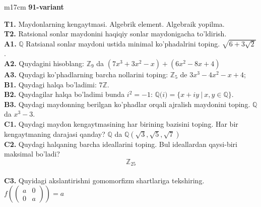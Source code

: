 \documentclass{article}
\begin{document}
\begin{tabular}{m{17cm}}
\textbf{91-variant}
\newline

\textbf{T1.} Maydonlarning kengaytmasi. Algebrik element. Algebraik yopilma. \\
\textbf{T2.} Ratsional sonlar maydonini haqiqiy sonlar maydonigacha to'ldirish. \\
\textbf{A1.} \(\mathbb{Q}\) Ratsianal sonlar maydoni ustida minimal ko'phadalrini toping.
\(\sqrt{6 + 3\sqrt{2}}\). \\
\textbf{A2.} Quydagini hisoblang:
\(\mathbb{Z}_{9}\) da \(\left( 7x^{3} + 3x^{2} - x \right) + \left( 6x^{2} - 8x + 4 \right)\) \\
\textbf{A3.} Quydagi ko'phadlarning barcha nollarini toping:
\(\mathbb{Z}_{5}\) de \(3x^{3} - 4x^{2} - x + 4\); \\
\textbf{B1.} Quydagi halqa bo'ladimi:
\(7\mathbb{Z}\). \\
\textbf{B2.} Quydagilar halqa bo'ladimi bunda \(i^{2} = - 1\):
\(\mathbb{Q(}i) = \{ x + iy\ |\ x,y \in \mathbb{Q\}}\). \\
\textbf{B3.} Quydagi maydonning berilgan ko'phadlar orqali ajralish maydonini toping.
\(\mathbb{Q}\) da \(x^{3} - 3\). \\
\textbf{C1.} Quydagi maydon kengaytmasining har birining bazisini toping. Har bir kengaytmaning darajasi qanday?
\(\mathbb{Q}\) da \(\mathbb{Q}\left( \sqrt{3},\sqrt{5},\sqrt{7} \right)\) \\
\textbf{C2.} Quydagi halqaning barcha ideallarini toping. Bul ideallardan qaysi-biri maksimal bo'ladi?
\[\mathbb{Z}_{25}\] \\
\textbf{C3.} Quyidagi akslantirishni gomomorfizm shartlariga tekshiring. \(f\left( \begin{pmatrix}
a & 0 \\
0 & a
\end{pmatrix} \right) = a\) \\

\end{tabular}
\vspace{1cm}
\end{document}
